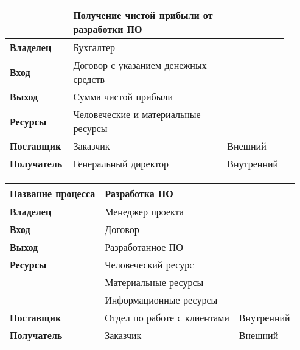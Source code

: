 \documentclass[a4paper,14pt]{extarticle}
\begin{document}
\if

\begin{table}[h!]
	\small
	\begin{tabular}{|p{0.22\linewidth}|p{0.54\linewidth}|p{0.15\linewidth}|}
		\hline
		\centerboldcell{Название процесса} & {Получение чистой прибыли от разработки ПО} &  \\ \hline
		\textbf{Владелец} & Бухгалтер &  \\ \hline
		\textbf{Вход} & Договор с указанием денежных средств &  \\ \hline
		\textbf{Выход} & Сумма чистой прибыли &  \\ \hline
		\textbf{Ресурсы} & Человеческие и материальные ресурсы &  \\ \hline
		\textbf{Поставщик} & Заказчик & Внешний \\ \hline
		\textbf{Получатель} & Генеральный директор & Внутренний \\ \hline
	\end{tabular}
	\label{}
\end{table}
\normalsize
\fi
\newpage
{}

\begin{table}[h!]
	\begin{center}
		\begin{tabular}{|l|l|l|}
			\hline
			\textbf{Название процесса} & Разработка ПО &  \\ \hline
			\textbf{Владелец} & Менеджер проекта &  \\ \hline
			\textbf{Вход} & Договор &  \\ \hline
			\textbf{Выход} & Разработанное ПО &  \\ \hline
			\multicolumn{ 1}{|l|}{\textbf{Ресурсы}} & Человеческий ресурс &  \\ \cline{ 2- 3}
			\multicolumn{ 1}{|l|}{} & Материальные ресурсы &  \\ \cline{ 2- 3}
			\multicolumn{ 1}{|l|}{} & Информационные ресурсы &  \\ \hline
			\textbf{Поставщик} & Отдел по работе с клиентами & Внутренний \\ \hline
			\textbf{Получатель} & Заказчик & Внешний \\ \hline
		\end{tabular}
	\end{center}
	\label{}
\end{table}

\if
\end{document}
